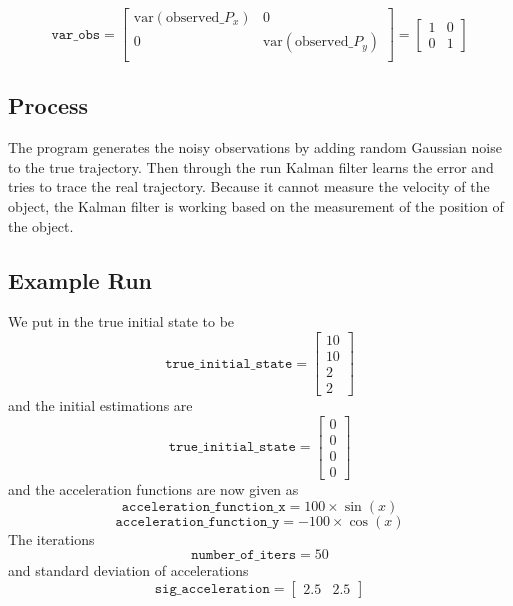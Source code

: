 \documentclass[12pt]{article}
\begin{document}
	\begin{equation}
			\mathtt{var\_obs}=
			\begin{bmatrix}
				\mathrm{var}(\mathrm{observed}\_P_x) & 0 \\
				0 & \mathrm{var}(\mathrm{observed}\_P_y) \\
			\end{bmatrix}=
			\begin{bmatrix}
				1 & 0 \\
				0 & 1
			\end{bmatrix}
	\end{equation}

	\subsection{Process}\label{sub:Process}
	The program generates the noisy observations by adding random Gaussian noise to the true trajectory. Then through the run Kalman filter learns the error and tries to trace the real trajectory. Because it cannot measure the velocity of the object, the Kalman filter is working based on the measurement of the position of the object.

	\subsection{Example Run}\label{sub:Example Run}
	We put in the true initial state to be
	\[
		\mathtt{true\_initial\_state}=
		\begin{bmatrix}
			10 \\ 10 \\ 2 \\ 2
		\end{bmatrix}
	\]
	and the initial estimations are
	\[
		\mathtt{true\_initial\_state}=
		\begin{bmatrix}
			0 \\ 0 \\ 0 \\ 0
		\end{bmatrix}
	\]
	and the acceleration functions are now given as
	\[
		\mathtt{acceleration\_function\_x}=100\times\sin(x)
	\]
	\[
		\mathtt{acceleration\_function\_y}=-100\times\cos(x)
	\]
	The iterations
	\[
		\mathtt{number\_of\_iters}=50
	\]
	and standard deviation of accelerations
	\[
		\mathtt{sig\_acceleration}=
		\begin{bmatrix}
			2.5 & 2.5
		\end{bmatrix}
	\]

\end{document}
